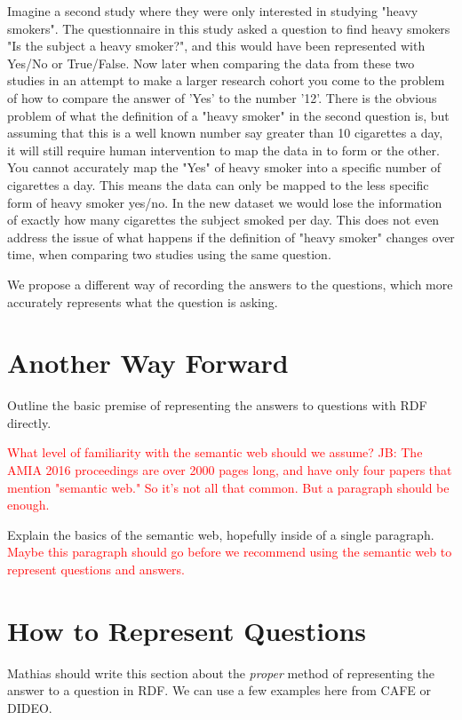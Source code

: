 \documentclass{amia}
\begin{document}
Imagine a second study where they were only interested in studying "heavy smokers".
The questionnaire in this study asked a question to find heavy smokers "Is the subject a heavy smoker?", and this would have been represented with Yes/No or True/False.
Now later when comparing the data from these two studies in an attempt to make a larger research cohort you come to the problem of how to compare the answer of 'Yes' to the number '12'.
There is the obvious problem of what the definition of a "heavy smoker" in the second question is, but assuming that this is a well known number say greater than 10 cigarettes a day, it will still require human intervention to map the data in to form or the other.
You cannot accurately map the "Yes" of heavy smoker into a specific number of cigarettes a day.
This means the data can only be mapped to the less specific form of heavy smoker yes/no.
In the new dataset we would lose the information of exactly how many cigarettes the subject smoked per day.
This does not even address the issue of what happens if the definition of "heavy smoker" changes over time, when comparing two studies using the same question.

We propose a different way of recording the answers to the questions, which more accurately represents what the question is asking.

\section*{Another Way Forward}
Outline the basic premise of representing the answers to questions with RDF directly.

\textcolor{red}{What level of familiarity with the semantic web should we assume?}
\textcolor{red}{JB: The AMIA 2016 proceedings are over 2000 pages long, and have only four papers that mention "semantic web." So it's not all that common. But a paragraph should be enough.}

Explain the basics of the semantic web, hopefully inside of a single paragraph.
\textcolor{red}{Maybe this paragraph should go before we recommend using the semantic web to represent questions and answers.}

\section*{How to Represent Questions}
Mathias should write this section about the \emph{proper} method of representing the answer to a question in RDF. We can use a few examples here from CAFE or DIDEO.
\end{document}
